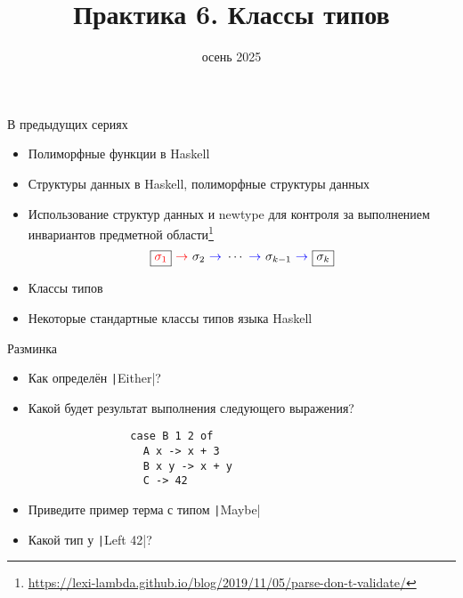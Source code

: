 
\newif\ifhandout




\title[6. Классы типов]{Практика 6. Классы типов}
\date{осень 2025}



    \setcounter{framenumber}{-1}
    \mymaketitle

    \begin{frame}[fragile]{В предыдущих сериях}
        \begin{itemize}
            \item Полиморфные функции в Haskell
            \item Структуры данных в Haskell, полиморфные структуры данных
            \item[\NB] Использование структур данных и newtype для контроля за выполнением инвариантов предметной области\footnote{\color{blue} \url{https://lexi-lambda.github.io/blog/2019/11/05/parse-don-t-validate/}}
            \begin{equation*}
                \framebox{\color{red}$\sigma_1$} {~\color{red} \rightarrow~} \sigma_2 {~\color{blue} \to~} \cdots {~\color{blue} \to~} \sigma_{k - 1} {~\color{blue} \to~} \framebox{$\sigma_k$}
            \end{equation*}
            \item[\newtopic] Классы типов
            \item[\newtopic] Некоторые стандартные классы типов языка Haskell
        \end{itemize}
    \end{frame}

    \begin{frame}[fragile]{Разминка}
        \begin{itemize}
            \item[\todo] Как определён \texttt|Either|?
            \item[\todo] Какой будет результат выполнения следующего выражения?
            \begin{verbatim}
                case B 1 2 of
                  A x -> x + 3
                  B x y -> x + y
                  C -> 42
            \end{verbatim}
            \item[\todo] Приведите пример терма с типом \texttt|Maybe|
            \item[\todo] Какой тип у \texttt|Left 42|?
        \end{itemize}
    \end{frame}

